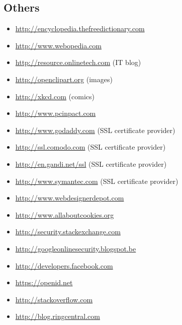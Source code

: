\subsection*{Others}
\begin{itemize}
\item \url{http://encyclopedia.thefreedictionary.com}
\item \url{http://www.webopedia.com}

\item \url{http://resource.onlinetech.com} (IT blog)
\item \url{http://openclipart.org} (images)
\item \url{http://xkcd.com} (comics) 
\item \url{http://www.pcinpact.com}

\item \url{http://www.godaddy.com} (SSL certificate provider)
\item \url{http://ssl.comodo.com} (SSL certificate provider)
\item \url{http://en.gandi.net/ssl} (SSL certificate provider)
\item \url{http://www.symantec.com} (SSL certificate provider)

\item \url{http://www.webdesignerdepot.com}
\item \url{http://www.allaboutcookies.org}
\item \url{http://security.stackexchange.com}
\item \url{http://googleonlinesecurity.blogspot.be}
\item \url{http://developers.facebook.com}
\item \url{https://openid.net}
\item \url{http://stackoverflow.com}
\item \url{http://blog.ringcentral.com}

\end{itemize}
